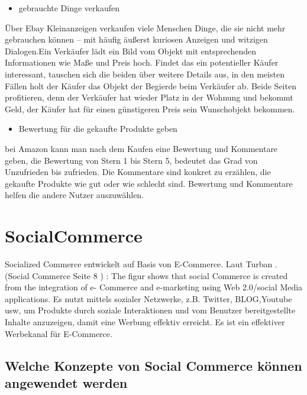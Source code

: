\begin{itemize}
\item gebrauchte Dinge verkaufen
\end{itemize}

Über Ebay Kleinanzeigen verkaufen viele Menschen Dinge, die sie nicht mehr gebrauchen können – mit häufig äußerst kuriosen Anzeigen und witzigen Dialogen.Ein Verkäufer lädt ein Bild vom Objekt mit entsprechenden Informationen wie Maße und Preis hoch. Findet das ein potentieller Käufer interessant, tauschen sich die beiden über weitere Details aus, in den meisten Fällen holt der Käufer das Objekt der Begierde beim Verkäufer ab. Beide Seiten profitieren, denn der Verkäufer hat wieder Platz in der Wohnung und bekommt Geld, der Käufer hat für einen günstigeren Preis sein Wunschobjekt bekommen.

\begin{itemize}
\item Bewertung für die gekaufte Produkte geben
\end{itemize}

bei Amazon kann man nach dem Kaufen eine Bewertung und Kommentare geben, die Bewertung von Stern 1 bis Stern 5, bedeutet das Grad von Unzufrieden bis zufrieden. Die Kommentare sind konkret zu erzählen, die gekaufte Produkte wie gut oder wie schlecht sind.
Bewertung und Kommentare helfen die andere Nutzer auszuwählen.


\section{SocialCommerce}

Socialized Commerce  entwickelt auf Basis von E-Commerce. Laut Turban . (Social Commerce Seite 8 ) :  The figur shows that social Commerce is created from the integration of e- Commerce and e-marketing using  Web 2.0/social Media applications. Es nutzt  mittels sozialer Netzwerke, z.B. Twitter, BLOG,Youtube usw, um Produkte durch soziale Interaktionen und vom Benutzer bereitgestellte Inhalte anzuzeigen, damit  eine  Werbung effektiv erreicht. Es ist ein effektiver Werbekanal für E-Commerce.


\subsection{Welche Konzepte von Social Commerce können angewendet werden}


